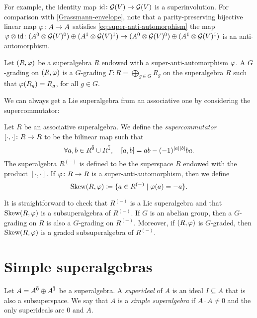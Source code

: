 For example, the identity map $\operatorname{id}\colon \mathcal G(V) \to \mathcal G(V)$ is a superinvolution. 
For comparison with \cref{Grassmann-envelope}, note that a parity-preserving bijective linear map $\varphi\colon A \to A$ satisfies \cref{eq:super-anti-automorphism} \IFF the map $\varphi \otimes \operatorname{id} \colon (A^{\bar0}\otimes \mathcal G(V)^{\bar0}) \oplus (A^{\bar1}\otimes \mathcal G(V)^{\bar1}) \to (A^{\bar0}\otimes \mathcal G(V)^{\bar0}) \oplus (A^{\bar1}\otimes \mathcal G(V)^{\bar1})$ is an anti-automorphism. 

\begin{defi}\label{defi:grd-superinv}
    Let $(R, \varphi)$ be a superalgebra $R$ endowed with a super\--anti\--auto\-mor\-phism $\varphi$. 
    A $G$-grading on $(R, \varphi)$ is a $G$-grading $\Gamma : R = \bigoplus_{g \in G} R_g$ on the superalgebra $R$ such that $\varphi(R_g) = R_g$, for all $g\in G$. 
\end{defi}

We can always get a Lie superalgebra from an associative one by considering the supercommutator:

\begin{defi}\label{defi:supercommutator}
    Let $R$ be an associative superalgebra. 
    We define the \emph{supercommutator} $[\cdot, \cdot]\colon R \to R$ to be the bilinear map such that
    \[
        \forall a,b\in R^{\bar0} \cup R^{\bar1}, \quad [a,b] = ab - (-1)^{|a||b|} ba.
    \]
    The superalgebra $R^{(-)}$ is defined to be the superspace $R$ endowed with the product $[\cdot, \cdot]$. 
    If $\varphi\colon R\to R$ is a super-anti-automorphism, then we define
    \[
        \operatorname{Skew}(R, \varphi) \coloneqq \{a \in R^{(-)} \mid \varphi(a) = -a \}.
    \]
\end{defi}

It is straightforward to check that $R^{(-)}$ is a Lie superalgebra and that $\operatorname{Skew}(R, \varphi)$ is a subsuperalgebra of $R^{(-)}$. 
If $G$ is an abelian group, then a $G$-grading on $R$ is also a $G$-grading on $R^{(-)}$. 
Moreover, if $(R, \varphi)$ is $G$-graded, then $\operatorname{Skew} (R, \varphi)$ is a graded subsuperalgebra of $R^{(-)}$. 

\section{Simple superalgebras}\label{sec:simple-algebras}

\begin{defi}
    Let $A = A^{\bar0} \oplus A^{\bar1}$ be a superalgebra. 
    A \emph{superideal} of $A$ is an ideal $I \subseteq A$ that is also a subsuperspace. 
    We say that $A$ is a  \emph{simple superalgebra} if $A\cdot A \neq 0$ and the only superideals are $0$ and $A$.
\end{defi}


